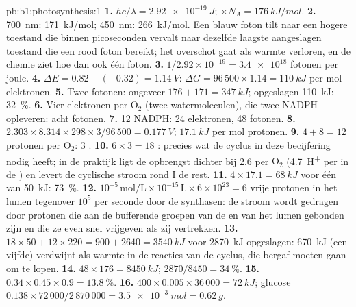 \begin{solution}{pb:b1:photosynthesis:1}
\textbf{1.} $hc/\lambda = \qty{2.92e-19}{J}$; $\times N_A = \qty{176}{kJ/mol}$.
\textbf{2.} \qty{700}{nm}: \qty{171}{kJ/mol}; \qty{450}{nm}: \qty{266}{kJ/mol}.
Een blauw foton tilt  naar een hogere toestand die binnen picoseconden
vervalt naar dezelfde laagste aangeslagen toestand die een rood foton bereikt; het
overschot gaat als warmte verloren, en de chemie ziet hoe dan ook één foton.
\textbf{3.} $1/2.92\times 10^{-19} = \num{3.4e18}$ fotonen per joule.
\textbf{4.} $\Delta E = 0.82 - (-0.32) = \qty{1.14}{V}$: $\Delta G =
96\,500\times 1.14 = \qty{110}{kJ}$ per mol elektronen.
\textbf{5.} Twee fotonen: ongeveer $176 + 171 = \qty{347}{kJ}$; opgeslagen
\qty{110}{kJ}: \qty{32}{\%}.
\textbf{6.} Vier elektronen per $\mathrm{O_2}$ (twee watermoleculen), die twee
NADPH opleveren: acht fotonen.
\textbf{7.} 12 NADPH: 24 elektronen, 48 fotonen.
\textbf{8.} $2.303\times 8.314\times 298\times 3/96\,500 = \qty{0.177}{V}$;
$\qty{17.1}{kJ}$ per mol protonen.
\textbf{9.} $4 + 8 = 12$ protonen per $\mathrm{O_2}$: 3 .
\textbf{10.} $6\times 3 = 18$ : precies wat de cyclus in deze becijfering nodig
heeft; in de praktijk ligt de opbrengst dichter bij 2,6 per $\mathrm{O_2}$
(\qty{4.7}{H^+} per  in de ) en levert de cyclische stroom rond
 I de rest.
\textbf{11.} $4\times 17.1 = \qty{68}{kJ}$ voor één  van \qty{50}{kJ}:
\qty{73}{\%}.
\textbf{12.} $10^{-5}\,\mathrm{mol/L}\times 10^{-15}\,\mathrm{L}\times
6\times 10^{23} = 6$ vrije protonen in het lumen tegenover $10^5$ per seconde door
de synthasen: de stroom wordt gedragen door protonen die aan de bufferende groepen
van de  en  van het lumen gebonden zijn en die ze even snel
vrijgeven als zij vertrekken.
\textbf{13.} $18\times 50 + 12\times 220 = 900 + 2640 = \qty{3540}{kJ}$ voor
\qty{2870}{kJ} opgeslagen: \qty{670}{kJ} (een vijfde) verdwijnt als warmte in de
reacties van de cyclus, die bergaf moeten gaan om te lopen.
\textbf{14.} $48\times 176 = \qty{8450}{kJ}$; $2870/8450 = \qty{34}{\%}$.
\textbf{15.} $0.34\times 0.45\times 0.9 = \qty{13.8}{\%}$.
\textbf{16.} $400\times 0.005\times 36\,000 = \qty{72}{kJ}$; glucose
$0.138\times 72\,000/2\,870\,000 = \qty{3.5e-3}{mol} = \qty{0.62}{g}$.

\end{solution}
